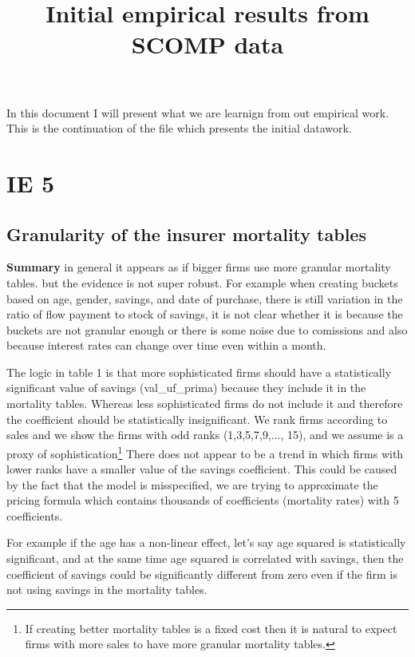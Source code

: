 \documentclass[12pt]{article}
\begin{document}
\title{Initial empirical results from SCOMP data}

\maketitle

In this document I will present what we are learnign from out empirical work. This is the continuation of the file which presents the initial datawork. 

\section{IE 5}

\subsection{Granularity of the insurer mortality tables}

\textbf{Summary} in general it appears as if bigger firms use more granular mortality tables. but the evidence is not super robust. For example when creating buckets based on age, gender, savings, and date of purchase, there is still variation in the ratio of flow payment to stock of savings, it is not clear whether it is because the buckets are not granular enough or there is some noise due to comissions and also because interest rates can change over time even within a month. 








The logic in table 1 is that more sophisticated firms should have a statistically significant value of savings (val\_uf\_prima) because they include it in the mortality tables. Whereas less sophisticated firms do not include it and therefore the coefficient should be statistically insignificant. We rank firms according to sales and we show the firms with odd ranks (1,3,5,7,9,..., 15), and we assume is a proxy of sophistication\footnote{If creating better mortality tables is a fixed cost then it is natural to expect firms with more sales to have more granular mortality tables.} There does not appear to be a trend in which firms with lower ranks have a smaller value of the savings coefficient. This could be caused by the fact that the model is misspecified, we are trying to approximate the pricing formula which contains thousands of coefficients (mortality rates) with 5 coefficients. 

For example if the age has a non-linear effect, let's say age squared is statistically significant, and at the same time age squared is correlated with savings, then the coefficient of savings could be significantly different from zero even if the firm is not using savings in the mortality tables.
\end{document}
